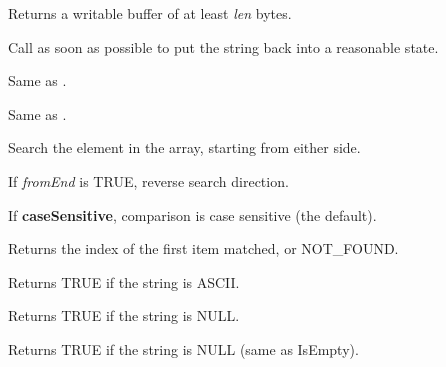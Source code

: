\label{wxstringgetwritebuf}


Returns a writable buffer of at least {\it len} bytes.

Call  as soon as possible
to put the string back into a reasonable state.

\label{wxstringIndex}


Same as .


Same as .


Search the element in the array, starting from either side.

If {\it fromEnd} is TRUE, reverse search direction.

If {\bf caseSensitive}, comparison is case sensitive (the default).

Returns the index of the first item matched, or NOT\_FOUND.

%
%
\label{wxstringIsAscii}


Returns TRUE if the string is ASCII.

\label{wxstringisempty}


Returns TRUE if the string is NULL.

\label{wxstringIsNull}


Returns TRUE if the string is NULL (same as IsEmpty).

\label{wxstringIsNumber}


